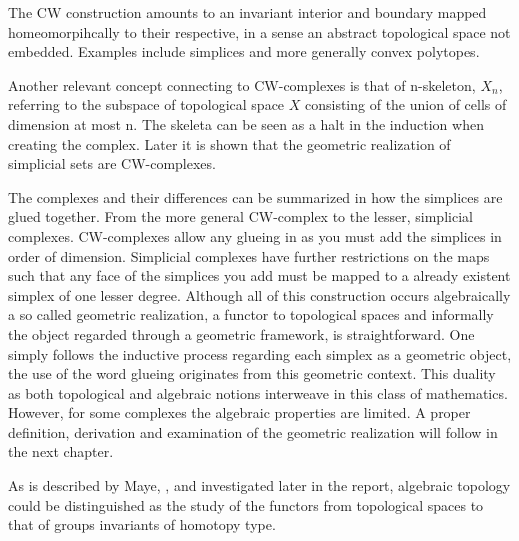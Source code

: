 \documentclass[../../main.tex]{subfiles}
\begin{document}
    The CW construction amounts to an invariant interior and boundary mapped homeomorpihcally to their respective, in a sense an abstract topological space not embedded. Examples include simplices and more generally convex polytopes.
    
    Another relevant concept connecting to CW-complexes is that of n-skeleton, $X_n$, referring to the subspace of topological space $X$ consisting of the union of cells of dimension at most n. The skeleta can be seen as a halt in the induction when creating the complex. Later it is shown that the geometric realization of simplicial sets are CW-complexes.

    The complexes and their differences can be summarized in how the simplices are glued together. From the more general CW-complex to the lesser, simplicial complexes. CW-complexes allow any glueing in as you must add the simplices in order of dimension. Simplicial complexes have further restrictions on the maps such that any face of the simplices you add must be mapped to a already existent simplex of one lesser degree. Although all of this construction occurs algebraically a so called geometric realization, a functor to topological spaces and informally the object regarded through a geometric framework, is straightforward. One simply follows the inductive process regarding each simplex as a geometric object, the use of the word glueing originates from this geometric context. This duality as both topological and algebraic notions interweave in this class of mathematics. However, for some complexes the algebraic properties are limited. A proper definition, derivation and examination of the geometric realization will follow in the next chapter.

    As is described by Maye, \cite{simp-maye}, and investigated later in the report, algebraic topology could be distinguished as the study of the functors from topological spaces to that of groups invariants of homotopy type. 

    
\end{document}
